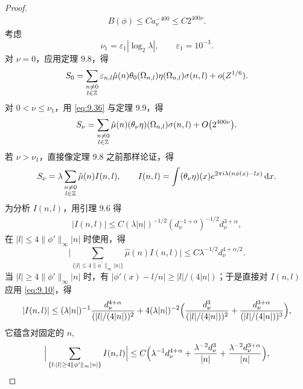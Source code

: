 \begin{proof}
\begin{align*}
  B(\phi)\leq C a_{\nu}^{-400}\leq C2^{400\nu}.
\end{align*}
考虑
\begin{equation}\label{eq:9.37}
  \nu_{1}=\varepsilon_{1}|\log_{2}\lambda|,\qquad \varepsilon_{1}=10^{-3}.
\end{equation}
对 $\nu = 0$，应用定理 9.8，得
\begin{equation}\label{eq:9.38}
  S_{0}=\sum_{\substack{n\neq 0\\ l\in\mathbb{Z}}}\varepsilon_{n,l}\hat{\mu}(n)\theta_{0}(\Omega_{n,l})\eta(\Omega_{n,l})\sigma(n,l)+o(Z^{1/6}).
\end{equation}
对 $0 < \nu \leq \nu_1$，用 \eqref{eq:9.36} 与定理 9.9，得
\begin{align*}
  S_{\nu}=\sum_{\substack{n\neq 0\\ l\in\mathbb{Z}}}\hat{\mu}(n)(\theta_{\nu}\eta)(\Omega_{n,l})\sigma(n,l)+O\bigl(2^{400\nu}\bigr).
\end{align*}
若 $\nu > \nu_1$，直接像定理 9.8 之前那样论证，得
\begin{align*}
  S_{\nu}=\lambda\sum_{\substack{n\neq 0\\ l\in\mathbb{Z}}}\hat{\mu}(n)I(n,l),
  \qquad
  I(n,l)=\int(\theta_{\nu}\eta)(x)e^{2\pi i\lambda(n\phi(x)-l x)}\,\mathrm{d}x.
\end{align*}
为分析 $I(n, l)$，用引理 9.6 得
\begin{align*}
  |I(n,l)|\leq C(\lambda|n|)^{-1/2}(d_{\nu}^{-1+\alpha})^{-1/2}d_{\nu}^{3+\alpha},
\end{align*}
在 $|l| \leq 4\|\phi'\|_\infty|n|$ 时使用，得
\begin{equation}\label{eq:9.39}
  \Big|\sum_{\{|l|\leq 4\|\phi^{\prime}\|_{\infty}|n|\}}\hat{\mu}(n)I(n,l)\Big|
  \leq C\lambda^{-1/2}d_{\nu}^{4+\alpha/2}.
\end{equation}
当 $|l| \geq 4\|\phi'\|_\infty|n|$ 时，有 $|\phi'(x) - l/n| \geq |l|/(4|n|)$；于是直接对 $I(n, l)$ 应用 \eqref{eq:9.10}，得
\begin{align*}
  |I(n,l)|\leq(\lambda|n|)^{-1}\frac{d_{\nu}^{4+\alpha}}{(|l|/(4|n|))^{2}}
  +4(\lambda|n|)^{-2}\Bigl(\frac{d_{\nu}^{3}}{(|l|/(4|n|))^{2}}
  +\frac{d_{\nu}^{3+\alpha}}{(|l|/(4|n|))^{3}}\Bigr),
\end{align*}
它蕴含对固定的 $n$,
\begin{align*}
  \Big|\sum_{\{l:|l|\geq 4\|\phi^{\prime}\|_{\infty}|n|\}}I(n,l)\Big|
  \leq C\Bigl(\lambda^{-1}d_{\nu}^{4+\alpha}+\frac{\lambda^{-2}d_{\nu}^{3}}{|n|}
  +\frac{\lambda^{-2}d_{\nu}^{3+\alpha}}{|n|}\Bigr),
\end{align*}

\end{proof}
